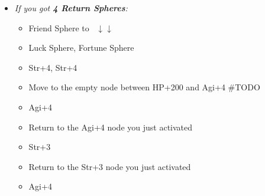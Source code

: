 \winnp
\lossvfill
\lossnp
\begin{spheregrid}
    \begin{itemize}
        \yunaf
        \begin{itemize}
            \item \textit{If you got \textbf{4 Return Spheres}:}
                \begin{itemize}
                    \item Friend Sphere to \lulu\ $\downarrow\downarrow$
                    \item Luck Sphere, Fortune Sphere
                    \item Str+4, Str+4
                    \item Move to the empty node between HP+200 and Agi+4 #TODO
                    \item Agi+4
                    \item Return to the Agi+4 node you just activated
                    \item Str+3
                    \item Return to the Str+3 node you just activated
                    \item Agi+4
                \end{itemize}

\end{itemize}
\end{itemize}
\end{spheregrid}
